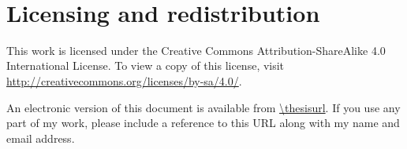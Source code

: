 \newpage
\thispagestyle{plain}
\
\vfill
{}
\section*{Licensing and redistribution}

This work is licensed under the Creative Commons Attribution-ShareAlike 4.0
International License.
To view a copy of this license,
visit \url{http://creativecommons.org/licenses/by-sa/4.0/}.
\begin{center}
\end{center}
An electronic version of this document is available from
\url{\thesisurl}.
If you use any part of my work,
please include a reference to this URL along with my name and email address.
